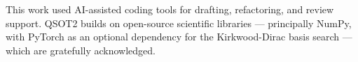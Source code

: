 This work used AI-assisted coding tools for drafting, refactoring, and review support.
QSOT2 builds on open-source scientific libraries --- principally NumPy, with PyTorch as
an optional dependency for the Kirkwood-Dirac basis search --- which are gratefully
acknowledged.
